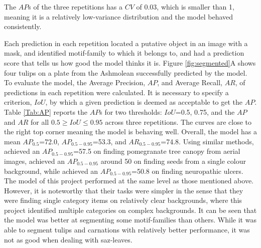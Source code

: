 \documentclass[11pt]{article}
\begin{document}
The $AP$s of the three repetitions has a $CV$ of 0.03, which is smaller than 1, meaning it is a relatively low-variance distribution and the model behaved consistently.\par
Each prediction in each repetition located a putative object in an image with a mask, and identified motif-family to which it belongs to, and had a prediction score that tells us how good the model thinks it is. Figure \ref{fig:segmented}A shows four tulips on a plate from the Ashmolean successfully predicted by the model. To evaluate the model, the Average Precision, $AP$, and Average Recall, $AR$, of predictions in each repetition were calculated. It is necessary to specify a criterion, $IoU$, by which a given prediction is deemed as acceptable to get the $AP$. Table \ref{Tab:AP} reports the $AP$s for two thresholds: $IoU$=0.5, 0.75, and the $AP$ and $AR$ for all $0.5 \geq IoU \leq 0.95$ across three repetitions. The curves are close to the right top corner meaning the model is behaving well. Overall, the model has a mean $AP_{0.5}$=72.0, $AP_{0.5-0.95}$=53.3, and $AR_{0.5-0.95}$=74.8. Using similar methods, \cite{zhao2018comparing} achieved an $AP_{0.5-0.95}$=57.5 on finding pomegranate tree canopy from aerial images, \cite{toda2020training} achieved an $AP_{0.5-0.95}$ around 50 on finding seeds from a single colour background, while \cite{8759574} achieved an $AP_{0.5-0.95}$=50.8 on finding neuropathic ulcers. The model of this project performed at the same level as those mentioned above. However, it is noteworthy that their tasks were simpler in the sense that they were finding single category items on relatively clear backgrounds, where this project identified multiple categories on complex backgrounds. It can be seen that the model was better at segmenting some motif-families than others. While it was able to segment tulips and carnations with relatively better performance, it was not as good when dealing with saz-leaves.\par
\end{document}
